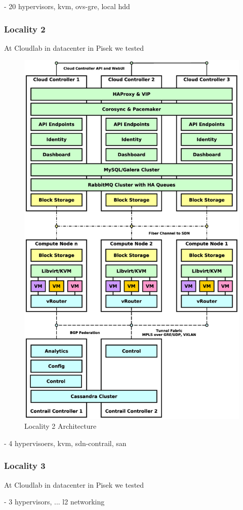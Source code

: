 - 20 hypervisors, kvm, ovs-gre, local hdd

\subsubsection{Locality 2}

At Cloudlab in datacenter in Pisek we tested

\begin{figure}[!h]
\centering
\includegraphics[scale=.2]{img/use_case_ha_sdn.eps}
\caption{Locality 2 Architecture}
\label{fig:cm}
\end{figure}

- 4 hypervisoers, kvm, sdn-contrail, san

\subsubsection{Locality 3}

At Cloudlab in datacenter in Pisek we tested



- 3 hypervisors, ... l2 networking 

